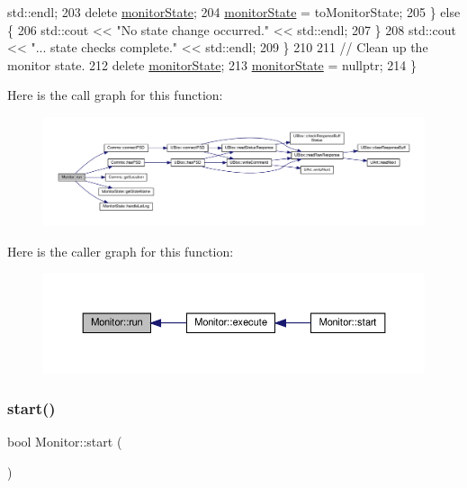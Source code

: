 \begin{DoxyCode}
      std::endl;
203             \textcolor{keyword}{delete} \hyperlink{class_monitor_a56b40e06ac7f2f36520e82ee01a17d4c}{monitorState};
204             \hyperlink{class_monitor_a56b40e06ac7f2f36520e82ee01a17d4c}{monitorState} = toMonitorState;
205         \} \textcolor{keywordflow}{else} \{
206             std::cout << \textcolor{stringliteral}{"No state change occurred."} << std::endl;
207         \}
208         std::cout << \textcolor{stringliteral}{"... state checks complete."} << std::endl;
209     \}
210 
211     \textcolor{comment}{// Clean up the monitor state.}
212     \textcolor{keyword}{delete} \hyperlink{class_monitor_a56b40e06ac7f2f36520e82ee01a17d4c}{monitorState};
213     \hyperlink{class_monitor_a56b40e06ac7f2f36520e82ee01a17d4c}{monitorState} = \textcolor{keyword}{nullptr};
214 \}
\end{DoxyCode}
Here is the call graph for this function\+:
\nopagebreak
\begin{figure}[H]
\begin{center}
\leavevmode
\includegraphics[width=350pt]{d9/df7/class_monitor_a81666ecd4a8db05fd3090f7e47eca6ed_cgraph}
\end{center}
\end{figure}
Here is the caller graph for this function\+:
\nopagebreak
\begin{figure}[H]
\begin{center}
\leavevmode
\includegraphics[width=350pt]{d9/df7/class_monitor_a81666ecd4a8db05fd3090f7e47eca6ed_icgraph}
\end{center}
\end{figure}
\mbox{\label{class_monitor_a71dfa92dfa25ee137f4e3d5e01a8d673}} 
\subsubsection{\texorpdfstring{start()}{start()}\hspace{0.1cm}{\footnotesize\ttfamily [1/2]}}
{\footnotesize\ttfamily bool Monitor\+::start (\begin{DoxyParamCaption}{ }\end{DoxyParamCaption})}

